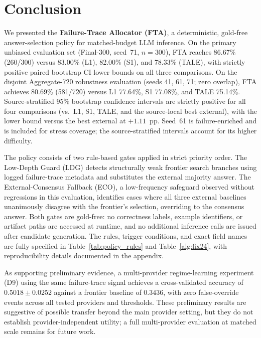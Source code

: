 \section{Conclusion}
\label{sec:conclusion}

We presented the \textbf{Failure-Trace Allocator (FTA)}, a deterministic,
gold-free answer-selection policy for matched-budget LLM inference.
On the primary unbiased evaluation set (Final-300, seed~71, $n=300$), FTA
reaches 86.67\% (260/300) versus 83.00\% (L1), 82.00\% (S1), and 78.33\%
(TALE), with strictly positive paired bootstrap CI lower bounds on all three
comparisons.
On the disjoint Aggregate-720 robustness evaluation (seeds 41, 61, 71; zero
overlap), FTA achieves 80.69\% (581/720) versus L1 77.64\%, S1 77.08\%, and
TALE 75.14\%.
Source-stratified 95\% bootstrap confidence intervals are strictly positive
for all four comparisons (vs.\ L1, S1, TALE, and the source-local best
external), with the lower bound versus the best external at $+1.11$~pp.
Seed~61 is failure-enriched and is included for stress coverage; the
source-stratified intervals account for its higher difficulty.

The policy consists of two rule-based gates applied in strict priority order.
The Low-Depth Guard (LDG) detects structurally weak frontier search branches
using logged failure-trace metadata and substitutes the external majority
answer.
The External-Consensus Fallback (ECO), a low-frequency safeguard observed
without regressions in this evaluation, identifies cases where all three external
baselines unanimously disagree with the frontier's selection, overriding
to the consensus answer.
Both gates are gold-free: no correctness labels, example identifiers, or
artifact paths are accessed at runtime, and no additional inference calls are
issued after candidate generation.
The rules, trigger conditions, and exact field names are fully specified in
Table~\ref{tab:policy_rules} and Table~\ref{alg:fix24}, with reproducibility
details documented in the appendix.

As supporting preliminary evidence, a multi-provider regime-learning experiment (D9) using
the same failure-trace signal achieves a cross-validated accuracy of
$0.5018 \pm 0.0252$ against a frontier baseline of $0.3436$, with zero
false-override events across all tested providers and thresholds.
These preliminary results are suggestive of possible transfer beyond the
main provider setting, but they do not establish provider-independent
utility; a full multi-provider evaluation at matched scale remains for
future work.

